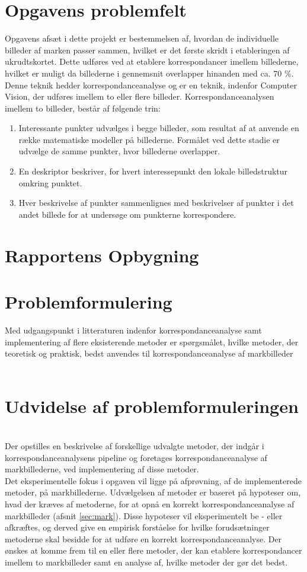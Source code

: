 \section{Opgavens problemfelt} \label{subsec:felt}
Opgavens afsæt i dette projekt er bestemmelsen af, hvordan de individuelle billeder af marken passer sammen, hvilket er det første skridt i etableringen af ukrudtskortet. Dette udføres ved at etablere korrespondancer imellem billederne, hvilket er muligt da billederne i gennemsnit overlapper hinanden med ca. 70 \%. Denne teknik hedder korrespondanceanalyse og er en teknik, indenfor Computer Vision, der udføres imellem to eller flere billeder. Korrespondanceanalysen imellem to billeder, består af følgende trin: 
\begin{enumerate}
\item{Interessante punkter udvælges i begge billeder, som resultat af at anvende en række matematiske modeller på billederne. Formålet ved dette stadie er udvælge de samme punkter, hvor billederne overlapper.}
\item{En deskriptor beskriver, for hvert interessepunkt den lokale billedstruktur omkring punktet.}
\item{Hver beskrivelse af punkter sammenlignes med beskrivelser af punkter i det andet billede  for at undersøge om punkterne korrespondere.}
\end{enumerate}
\section{Rapportens Opbygning}
\section{Problemformulering} \label{subsec:form}
Med udgangspunkt i litteraturen indenfor
korrespondanceanalyse samt implementering af
flere eksisterende metoder er spørgsmålet, hvilke metoder, der teoretisk og praktisk, bedst anvendes til korrespondanceanalyse af markbilleder \\ \\
\section{Udvidelse af problemformuleringen} \\
Der opstilles en beskrivelse af forskellige udvalgte metoder, der indgår i korrespondanceanalysens pipeline og foretages korrespondanceanalyse af markbillederne, ved implementering af disse metoder. \\
Det eksperimentelle fokus i opgaven vil ligge på afprøvning, af de implementerede metoder, på markbillederne. Udvælgelsen af metoder er baseret på hypoteser om, hvad der kræves af metoderne, for at opnå en korrekt korrespondanceanalyse af markbilleder (afsnit \ref{sec:mark}). Disse hypoteser vil eksperimentelt be - eller afkræftes, og derved give en empirisk forståelse for hvilke forudsætninger metoderne skal besidde for at udføre en korrekt korrespondanceanalyse. Der ønskes at komme frem til en eller flere metoder, der kan etablere korrespondancer imellem to markbilleder samt en analyse af, hvilke metoder der gør det bedst.
